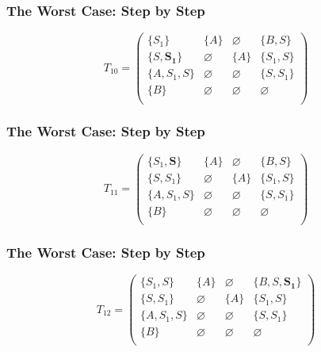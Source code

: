 \documentclass[xcolor=table]{beamer}
\begin{document}
\begin{frame}[noframenumbering]
  \transwipe[direction=90]
  \frametitle{The Worst Case: Step by Step}
\begin{figure}[h]
\[
T_{10} = \begin{pmatrix}
\{S_1\}     & \{A\}       & \varnothing & \{B, S\}    \\
\{S, \pmb{S_1}\}       & \varnothing & \{A\}       & \{S_1, S\}     \\
\{A, S_1, S\}  & \varnothing & \varnothing & \{S, S_1\} \\
\{B\}       & \varnothing & \varnothing & \varnothing \\
\end{pmatrix}
\]
\label{ExampleQueryFirstIteration}
\end{figure}
\end{frame} 

\begin{frame}[noframenumbering]
  \transwipe[direction=90]
  \frametitle{The Worst Case: Step by Step}

\begin{figure}[h]
\[
T_{11} = \begin{pmatrix}
\{S_1, \pmb{S}\}     & \{A\}       & \varnothing & \{B, S\}    \\
\{S, S_1\}       & \varnothing & \{A\}       & \{S_1, S\}     \\
\{A, S_1, S\}  & \varnothing & \varnothing & \{S, S_1\} \\
\{B\}       & \varnothing & \varnothing & \varnothing \\
\end{pmatrix}
\]
\label{ExampleQueryFirstIteration}
\end{figure}
\end{frame} 

\begin{frame}[noframenumbering]
  \transwipe[direction=90]
  \frametitle{The Worst Case: Step by Step}

\begin{figure}[h]
\[
T_{12} = \begin{pmatrix}
\{S_1, S\}     & \{A\}       & \varnothing & \{B, S, \pmb{S_1}\}    \\
\{S, S_1\}       & \varnothing & \{A\}       & \{S_1, S\}     \\
\{A, S_1, S\}  & \varnothing & \varnothing & \{S, S_1\} \\
\{B\}       & \varnothing & \varnothing & \varnothing \\
\end{pmatrix}
\]
\label{ExampleQueryFirstIteration}
\end{figure}
\end{frame} 
\end{document}
